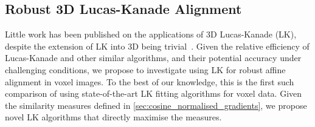 \subsection{Robust 3D Lucas-Kanade Alignment}\label{subsec:singl_img_lk_3d}
Little work has been published on the applications of 3D Lucas-Kanade (LK),
despite the extension of LK into 3D being trivial~\cite{RefWorks:75}. Given the
relative efficiency of Lucas-Kanade and other similar algorithms, and their
potential accuracy under challenging conditions, we propose to investigate using
LK for robust affine alignment in voxel images. To the best of our knowledge,
this is the first such comparison of using state-of-the-art LK fitting
algorithms for voxel data. Given the similarity measures defined in
\cref{sec:cosine_normalised_gradients}, we propose novel LK algorithms
that directly maximise the measures.



